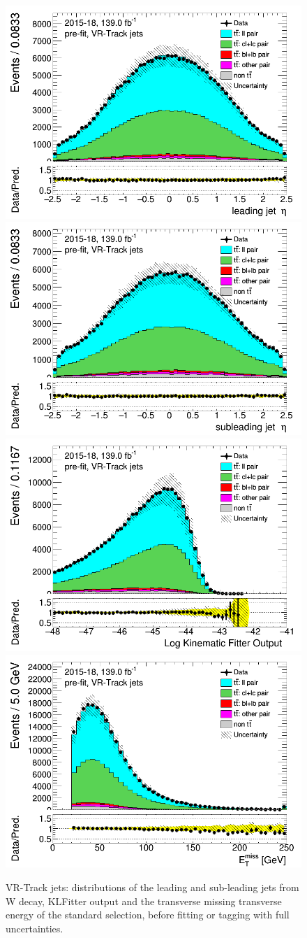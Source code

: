 \newpage	
\begin{figure}[H]
\includegraphics[width=.45\textwidth]{FTAG_plots/pretagNoRwwithouthighpTVRJetsall/DataMC_h_J0_etatrackjet.png}
\includegraphics[width=.45\textwidth]{FTAG_plots/pretagNoRwwithouthighpTVRJetsall/DataMC_h_J1_etatrackjet.png}\\
\includegraphics[width=.45\textwidth]{FTAG_plots/pretagNoRwwithouthighpTVRJetsall/DataMC_h_LLRtrackjet.png}
\includegraphics[width=.45\textwidth]{FTAG_plots/pretagNoRwwithouthighpTVRJetsall/DataMC_h_METtrackjet.png}\\

\caption{VR-Track jets: distributions of the leading and sub-leading jets 
from W decay, KLFitter output and the transverse missing transverse 
energy of the standard selection, before fitting or tagging with 
full uncertainties.} \label{fig:standard_jets_VRJets}
\end{figure}



